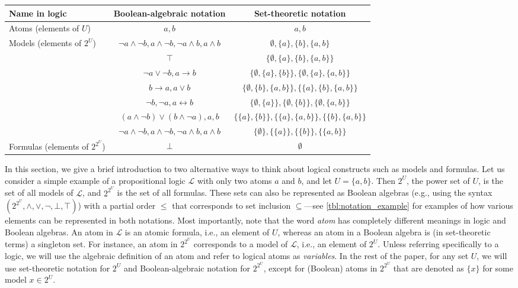 \documentclass{uai2021} %
\theoremstyle{definition}
\begin{document}
\begin{table*}
  \caption{Notation for a logic with two atoms. The elements in both columns are
    listed in the same order.}
  \label{tbl:notation_example}
  \centering
  \begin{tabular}{lcc}
    \toprule
    Name in logic & Boolean-algebraic notation & Set-theoretic notation \\
    \midrule
    Atoms (elements of $U$) & $a, b$ & $a, b$ \\
    \rowcolor{gray!10} Models (elements of $2^U$) & $\neg a \land \neg b, a \land \neg b, \neg a \land b, a \land b$ & $\emptyset, \{a\}, \{b\}, \{a, b\}$ \\
    & $\top$ & $\{ \emptyset, \{a\}, \{b\}, \{a, b\} \}$ \\
    & $\neg a \lor \neg b, a \to b$ & $\{ \emptyset, \{a\}, \{b\} \}, \{ \emptyset, \{a\}, \{a, b\} \}$ \\
    & $b \to a, a \lor b$ & $\{ \emptyset, \{b\}, \{a, b\} \}, \{ \{a\}, \{b\}, \{a, b\} \}$ \\
    & $\neg b, \neg a, a \leftrightarrow b$ & $\{\emptyset, \{a\}\}, \{\emptyset, \{b\}\}, \{\emptyset, \{a, b\}\}$ \\
    & $(a \land \neg b) \lor (b \land \neg a), a, b$ & $\{\{a\}, \{b\}\}, \{\{a\}, \{a, b\}\}, \{\{b\}, \{a, b\}\}$ \\
    & $\neg a \land \neg b, a \land \neg b, \neg a \land b, a \land b$ & $\{\emptyset\}, \{\{a\}\}, \{\{b\}\}, \{\{a, b\}\}$ \\
    \multirow{-7}{*}{Formulas (elements of $2^{2^U}$)} & $\bot$ & $\emptyset$ \\
    \bottomrule
  \end{tabular}
\end{table*}

In this section, we give a brief introduction to two alternative ways to think
about logical constructs such as models and formulas. Let us consider a simple
example of a propositional logic $\mathcal{L}$ with only two atoms $a$ and $b$,
and let $U = \{ a, b \}$. Then $2^U$, the power set of $U$, is the set of all
models of $\mathcal{L}$, and $2^{2^U}$ is the set of all formulas. These sets
can also be represented as Boolean algebras (e.g., using the syntax $(2^{2^U},
\land, \lor, \neg, \bot, \top)$) with a partial order $\le$ that corresponds to
set inclusion $\subseteq$---see \cref{tbl:notation_example} for examples of how
various elements can be represented in both notations. Most importantly, note
that the word \emph{atom} has completely different meanings in logic and Boolean
algebras. An atom in $\mathcal{L}$ is an atomic formula, i.e., an element of
$U$, whereas an atom in a Boolean algebra is (in set-theoretic terms) a
singleton set. For instance, an atom in $2^{2^U}$ corresponds to a model of
$\mathcal{L}$, i.e., an element of $2^U$. Unless referring specifically to a
logic, we will use the algebraic definition of an atom and refer to logical
atoms as \emph{variables}. In the rest of the paper, for any set $U$, we will
use set-theoretic notation for $2^U$ and Boolean-algebraic notation for
$2^{2^U}$, except for (Boolean) atoms in $2^{2^U}$ that are denoted as $\{x\}$
for some model $x \in 2^U$.
\end{document}
